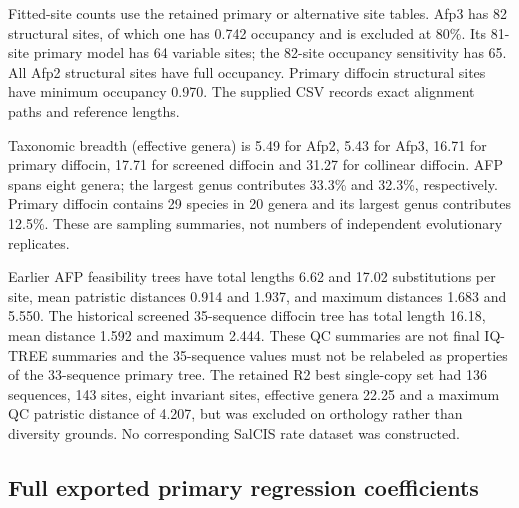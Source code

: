 Fitted-site counts use the retained primary or alternative site tables. Afp3 has 82 structural sites, of which one has 0.742 occupancy and is excluded at 80\%. Its 81-site primary model has 64 variable sites; the 82-site occupancy sensitivity has 65. All Afp2 structural sites have full occupancy. Primary diffocin structural sites have minimum occupancy 0.970. The supplied CSV records exact alignment paths and reference lengths.

Taxonomic breadth (effective genera) is 5.49 for Afp2, 5.43 for Afp3, 16.71 for primary diffocin, 17.71 for screened diffocin and 31.27 for collinear diffocin. AFP spans eight genera; the largest genus contributes 33.3\% and 32.3\%, respectively. Primary diffocin contains 29 species in 20 genera and its largest genus contributes 12.5\%. These are sampling summaries, not numbers of independent evolutionary replicates.

Earlier AFP feasibility trees have total lengths 6.62 and 17.02 substitutions per site, mean patristic distances 0.914 and 1.937, and maximum distances 1.683 and 5.550. The historical screened 35-sequence diffocin tree has total length 16.18, mean distance 1.592 and maximum 2.444. These QC summaries are not final IQ-TREE summaries and the 35-sequence values must not be relabeled as properties of the 33-sequence primary tree. The retained R2 best single-copy set had 136 sequences, 143 sites, eight invariant sites, effective genera 22.25 and a maximum QC patristic distance of 4.207, but was excluded on orthology rather than diversity grounds. No corresponding SalCIS rate dataset was constructed.

\subsection{Full exported primary regression coefficients}

